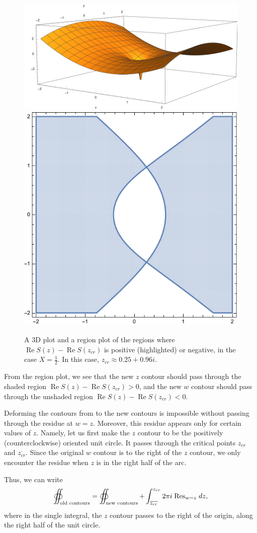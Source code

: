 \documentclass[letterpaper,11pt,oneside,reqno]{article}
\numberwithin{equation}{section}
\newcommand{\ssp}{\hspace{1pt}}
\theoremstyle{definition}
\begin{document}
\begin{figure}[htpb]
	\centering
	\includegraphics[height=.3\textwidth]{pictures/ReS_imaginary_3D.pdf}
	\qquad
	\includegraphics[height=.3\textwidth]{pictures/ReS_imaginary_region.pdf}
	\caption{A 3D plot and a region plot of the
	regions where $\operatorname{Re}S(z)-\operatorname{Re}S(z_{cr})$ is positive
	(highlighted) or negative, in the case $X=\frac{1}{2}$.
	In this case, $z_{cr}\approx 0.25+0.96 i$.}
	\label{fig:ReS_imaginary}
\end{figure}

From the region plot, we see that the new $z$ contour should
pass through the shaded region $\operatorname{Re}S(z)-\operatorname{Re}S(z_{cr})>0$,
and the new $w$ contour should pass through the unshaded region
$\operatorname{Re}S(z)-\operatorname{Re}S(z_{cr})<0$.

Deforming the contours from  to the new contours
is impossible without passing through the residue at $w=z$.
Moreover, this residue appears only for certain values of $z$. Namely,
let us first make the $z$ contour to be the positively (counterclockwise) oriented
unit circle.
It passes through the critical points $z_{cr}$ and $\overline{z_{cr}}$.
Since the original $w$ contour is to the right of the $z$ contour, we only
encounter the residue when $z$ is in the right half of the arc.

Thus, we can write
\begin{equation}
	\label{eq:K_n_bulk_deformation}
	\oiint_{\textnormal{old contours}}=
	\oiint_{\textnormal{new contours}}
	+
	\int_{\overline{z_{cr}}}^{z_{cr}}
	2\pi i\ssp \operatorname{Res}\limits_{w=z}\ssp dz,
\end{equation}
where in the single integral, the $z$ contour passes to the right of the origin,
along the right half of the unit circle.
\end{document}
